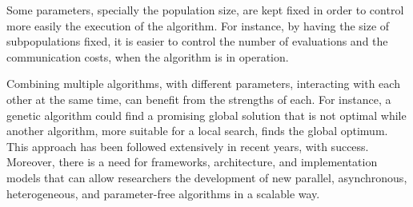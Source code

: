 \documentclass[review]{elsarticle}
\begin{document}
Some parameters, specially the population size, are
kept fixed in order to control more easily the execution of the algorithm. For
instance, by having the size of subpopulations fixed, it is easier to control
the number of evaluations and the communication costs, when the algorithm is in
operation.

Combining multiple algorithms, with different parameters, interacting with each
other at the same time, can benefit from the strengths of each. For instance, a
genetic algorithm could find a promising global solution that is not optimal
while another algorithm, more suitable for a local search, finds the global
optimum. This approach has been followed extensively in recent years, with
success. Moreover, there is a need for frameworks, architecture, and
implementation models that can allow researchers the development of new
parallel, asynchronous, heterogeneous, and parameter-free algorithms in a scalable way.  




\end{document}

